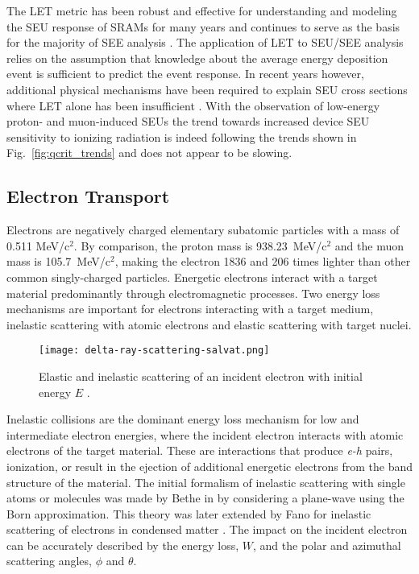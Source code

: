 The LET metric has been robust and effective for understanding and modeling the SEU response of SRAMs for many years and continues to serve as the basis for the majority of SEE analysis \cite{Dodd:1998tn,Dodd:1998ua,Dodd:2001tx}.
The application of LET to SEU/SEE analysis relies on the assumption that knowledge about the average energy deposition event is sufficient to predict the event response. 
In recent years however, additional physical mechanisms have been required to explain SEU cross sections where LET alone has been insufficient \cite{Reed:2002wn,Kobayashi:2005jt,Reed:2006cx,Reed:2007vz,Warren:2007ca}. 
With the observation of low-energy proton- and muon-induced SEUs the trend towards increased device SEU sensitivity to ionizing radiation is indeed following the trends shown in Fig.~\ref{fig:qcrit_trends} and does not appear to be slowing.

\subsection{Electron Transport} %
\label{sub:electron_transport}
Electrons are negatively charged elementary subatomic particles with a mass of 0.511 MeV/c$^2$.
By comparison, the proton mass is 938.23~MeV/c$^2$ and the muon mass is 105.7~MeV/c$^2$, making the electron 1836 and 206 times lighter than other common singly-charged particles.
Energetic electrons interact with a target material predominantly through electromagnetic processes. 
Two energy loss mechanisms are important for electrons interacting with a target medium, inelastic scattering with atomic electrons and elastic scattering with target nuclei.
\begin{figure}[tb]
    \begin{center}
        \texttt{[image: delta-ray-scattering-salvat.png]}
    \end{center}
    \caption[Elastic and inelastic scattering of an incident electron with initial energy $E$.]{Elastic and inelastic scattering of an incident electron with initial energy $E$ \cite{Salvat:ue}.}
    \label{fig:electron-scattering-elastic-inelastic}
\end{figure}

Inelastic collisions are the dominant energy loss mechanism for low and intermediate electron energies, where the incident electron interacts with atomic electrons of the target material.
These are interactions that produce \emph{e-h} pairs, ionization, or result in the ejection of additional energetic electrons from the band structure of the material.
The initial formalism of inelastic scattering with single atoms or molecules was made by Bethe in \cite{bethe1930theorie,bethe1932bremsformel} by considering a plane-wave using the Born approximation.
This theory was later extended by Fano for inelastic scattering of electrons in condensed matter \cite{fano1964penetration}.
The impact on the incident electron can be accurately described by the energy loss, $W$, and the polar and azimuthal scattering angles, $\phi$ and $\theta$.

